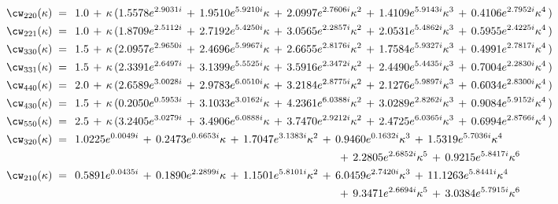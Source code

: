 \begin{align}
	\label{eq:cw_fit_1}
	\cw_{220}(\kappa) \; &= \;\, 1.0 \, + \, \kappa \, (1.5578 e^{2.9031 i}\, + \, 1.9510  e^{5.9210 i} \kappa\, + \, 2.0997  e^{2.7606 i} \kappa ^ 2\, + \, 1.4109  e^{5.9143 i} \kappa ^ 3\, + \, 0.4106  e^{2.7952 i} \kappa ^ 4 \, )  \\
	\label{eq:cw_fit_2}
	\cw_{221}(\kappa) \; &= \;\, 1.0 \, + \, \kappa \, (1.8709 e^{2.5112 i}\, + \, 2.7192  e^{5.4250 i} \kappa\, + \, 3.0565  e^{2.2857 i} \kappa ^ 2\, + \, 2.0531  e^{5.4862 i} \kappa ^ 3\, + \, 0.5955  e^{2.4225 i} \kappa ^ 4 \, )  \\
	\label{eq:cw_fit_3}
	\cw_{330}(\kappa) \; &= \;\, 1.5 \, + \, \kappa \, (2.0957 e^{2.9650 i}\, + \, 2.4696  e^{5.9967 i} \kappa\, + \, 2.6655  e^{2.8176 i} \kappa ^ 2\, + \, 1.7584  e^{5.9327 i} \kappa ^ 3\, + \, 0.4991  e^{2.7817 i} \kappa ^ 4 \, )  \\ 
	\label{eq:cw_fit_4}
	\cw_{331}(\kappa) \; &= \;\, 1.5 \, + \, \kappa \, (2.3391 e^{2.6497 i}\, + \, 3.1399  e^{5.5525 i} \kappa\, + \, 3.5916  e^{2.3472 i} \kappa ^ 2\, + \, 2.4490  e^{5.4435 i} \kappa ^ 3\, + \, 0.7004  e^{2.2830 i} \kappa ^ 4 \, )  \\
	\label{eq:cw_fit_5}
	\cw_{440}(\kappa) \; &= \;\, 2.0 \, + \, \kappa \, (2.6589 e^{3.0028 i}\, + \, 2.9783  e^{6.0510 i} \kappa\, + \, 3.2184  e^{2.8775 i} \kappa ^ 2\, + \, 2.1276  e^{5.9897 i} \kappa ^ 3\, + \, 0.6034  e^{2.8300 i} \kappa ^ 4 \, )  \\
	\label{eq:cw_fit_6}
	\cw_{430}(\kappa) \; &= \;\, 1.5 \, + \, \kappa \, (0.2050 e^{0.5953 i}\, + \, 3.1033  e^{3.0162 i} \kappa\, + \, 4.2361  e^{6.0388 i} \kappa ^ 2\, + \, 3.0289  e^{2.8262 i} \kappa ^ 3\, + \, 0.9084  e^{5.9152 i} \kappa ^ 4 \, )  \\
	\label{eq:cw_fit_7}
	\cw_{550}(\kappa) \; &= \;\, 2.5 \, + \, \kappa \, (3.2405 e^{3.0279 i}\, + \, 3.4906  e^{6.0888 i} \kappa\, + \, 3.7470  e^{2.9212 i} \kappa ^ 2\, + \, 2.4725  e^{6.0365 i} \kappa ^ 3\, + \, 0.6994  e^{2.8766 i} \kappa ^ 4 \, )  \\
	\label{eq:cw_fit_8}
	\cw_{320}(\kappa) \; &= \;\,1.0225 e^{0.0049 i}\, + \, 0.2473  e^{0.6653 i} \kappa\, + \, 1.7047  e^{3.1383 i} \kappa ^ 2\, + \, 0.9460  e^{0.1632 i} \kappa ^ 3\, + \, 1.5319  e^{5.7036 i} \kappa ^ 4\\ \nonumber
	&\hspace{255pt}\, + \, 2.2805  e^{2.6852 i} \kappa ^ 5\, + \, 0.9215  e^{5.8417 i} \kappa ^ 6 \\
	\label{eq:cw_fit_9}
	\cw_{210}(\kappa) \; &= \;\,0.5891 e^{0.0435 i}\, + \, 0.1890  e^{2.2899 i} \kappa\, + \, 1.1501  e^{5.8101 i} \kappa ^ 2\, + \, 6.0459  e^{2.7420 i} \kappa ^ 3\, + \, 11.1263  e^{5.8441 i} \kappa ^ 4\\ \nonumber
	&\hspace{255pt}\, + \, 9.3471  e^{2.6694 i} \kappa ^ 5\, + \, 3.0384  e^{5.7915 i} \kappa ^ 6
\end{align}
